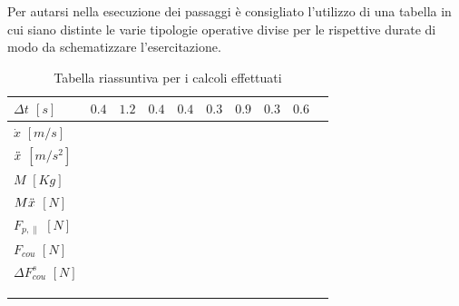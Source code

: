 Per autarsi nella esecuzione dei passaggi è consigliato l'utilizzo di una tabella in cui siano distinte le varie tipologie operative divise per le rispettive durate di modo da schematizzare l'esercitazione.

\begin{table}[h]
\centering
    \begin{tabular}{l|l|l|l|l|l|l|l|l|l}
    \hline
    $\Delta t$ $[s]$ & $0.4$ & $1.2$ & $0.4$ & $0.4$ & $0.3$ & $0.9$ & $0.3$ & $0.6$ & \hspace{1cm} \\ \hline
    $\dot x$ $[m/s]$ &  &  &  &  &  &  &  &  & \\ \cline{1-1}
    $\Ddot x$ $[m/s^2]$ &  &  &  &  &  &  &  &  &  \\ \cline{1-1}
    $M$ $[Kg]$ &  &  &  &  &  &  &  &  &  \\ \cline{1-1}
    $M \Ddot x$ $[N]$ &  &  &  &  &  &  &  &  &  \\ \cline{1-1}
    $F_{p,\parallel}$ $[N]$ &  &  &  &  &  &  &  &  &  \\ \cline{1-1}
    $F_{cou}$ $[N]$ &  &  &  &  &  &  &  &  &  \\ \cline{1-1}
    $\Delta F_{cou}^s$ $[N]$ &  &  &  &  &  &  &  &  &  \\ \cline{1-1}
     &  &  &  &  &  &  &  &  &  \\ \cline{1-1}
     &  &  &  &  &  &  &  &  &  \\ \cline{1-1}
     &  &  &  &  &  &  &  &  &  \\ \cline{1-1}
    \end{tabular}
    \caption{Tabella riassuntiva per i calcoli effettuati}
\end{table}